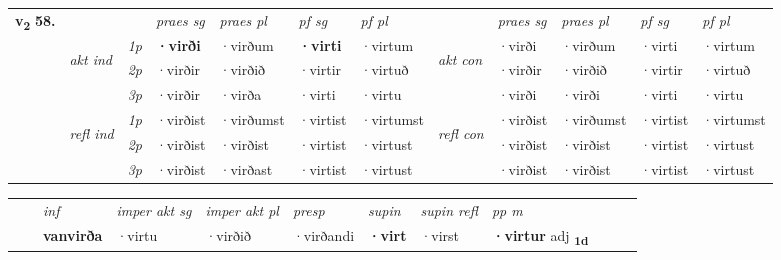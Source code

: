 \begin{tabular}{llllllllllll} \toprule
\multirow{4}{*}{{{\textbf{v{\textsubscript{2}}} \Large{\textbf{58.}}}}}  & &   &  \textit{praes sg}  & \textit{praes pl}  &\textit{ pf sg} & \textit{pf pl} &  &  \textit{praes sg}  & \textit{praes pl}  & \textit{pf sg} & \textit{pf pl } \\*
	\cmidrule{4-7} \cmidrule{9-12}
 & \multirow{3}{*}{\begin{turn}{90}\textit{akt ind}\end{turn}} & {\textit{1p}} & \textbf{·virði} & ·virðum    & \textbf{·virti} & ·virtum & \multirow{3}{*}{\begin{turn}{90}\textit{akt con}\end{turn}} &·virði & ·virðum & ·virti & ·virtum\\*
& &  {\textit{2p}} &  ·virðir  & ·virðið   & ·virtir & ·virtuð & & ·virðir & ·virðið & ·virtir & ·virtuð \\*
& &  {\textit{3p}} & ·virðir & ·virða   & ·virti & ·virtu & & ·virði & ·virði& ·virti & ·virtu  \\*
\cmidrule{4-7} \cmidrule{9-12}
 &\multirow{3}{*}{\begin{turn}{90}\textit{refl ind}\end{turn}} & {\textit{1p}} & ·virðist & ·virðumst    & ·virtist & ·virtumst & \multirow{3}{*}{\begin{turn}{90}\textit{refl con}\end{turn}}  &·virðist & ·virðumst & ·virtist & ·virtumst\\*
 &&  {\textit{2p}} &  ·virðist  & ·virðist   & ·virtist & ·virtust & &·virðist & ·virðist & ·virtist & ·virtust \\*
& &  {\textit{3p}} & ·virðist & ·virðast   & ·virtist & ·virtust & & ·virðist & ·virðist& ·virtist & ·virtust  \\*
\cmidrule{4-7} \cmidrule{9-12}
\end{tabular}


\begin{tabular}{llllllllllll}
 & & \textit{inf} & \textit{imper akt sg} & \textit{imper akt pl}   & \textit{presp} & \textit{supin} & \textit{supin refl} & \textit{pp m}     \\*
  & & \textbf{vanvirða} & ·virtu  & ·virðið   & ·virðandi &  \textbf{·virt} & ·virst & \textbf{·virtur} adj \textbf{\textsubscript{1d}} \\*
\cmidrule{1-12}
\end{tabular}



